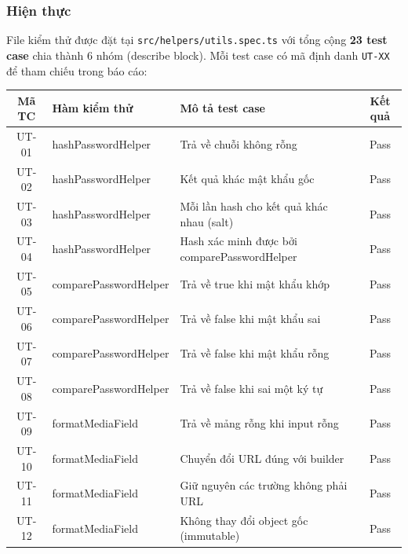\subsubsection{Hiện thực}

File kiểm thử được đặt tại \texttt{src/helpers/utils.spec.ts} với tổng cộng \textbf{23 test case} chia thành 6 nhóm (describe block). Mỗi test case có mã định danh \texttt{UT-XX} để tham chiếu trong báo cáo:

\begin{table}[H]
  \centering
  \renewcommand{\arraystretch}{1.3}
  \begin{tabular}{|c|l|p{6.5cm}|c|}
    \hline
    \textbf{Mã TC} & \textbf{Hàm kiểm thử} & \textbf{Mô tả test case}                     & \textbf{Kết quả} \\
    \hline
    UT-01          & hashPasswordHelper    & Trả về chuỗi không rỗng                      & Pass             \\
    UT-02          & hashPasswordHelper    & Kết quả khác mật khẩu gốc                    & Pass             \\
    UT-03          & hashPasswordHelper    & Mỗi lần hash cho kết quả khác nhau (salt)    & Pass             \\
    UT-04          & hashPasswordHelper    & Hash xác minh được bởi comparePasswordHelper & Pass             \\
    \hline
    UT-05          & comparePasswordHelper & Trả về true khi mật khẩu khớp                & Pass             \\
    UT-06          & comparePasswordHelper & Trả về false khi mật khẩu sai                & Pass             \\
    UT-07          & comparePasswordHelper & Trả về false khi mật khẩu rỗng               & Pass             \\
    UT-08          & comparePasswordHelper & Trả về false khi sai một ký tự               & Pass             \\
    \hline
    UT-09          & formatMediaField      & Trả về mảng rỗng khi input rỗng              & Pass             \\
    UT-10          & formatMediaField      & Chuyển đổi URL đúng với builder              & Pass             \\
    UT-11          & formatMediaField      & Giữ nguyên các trường không phải URL         & Pass             \\
    UT-12          & formatMediaField      & Không thay đổi object gốc (immutable)        & Pass             \\

\end{tabular}
\end{table}
